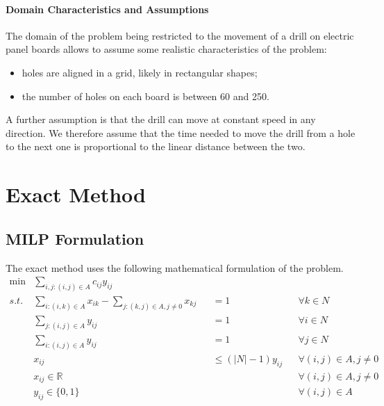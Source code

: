 \documentclass{article}
\begin{document}
\paragraph{Domain Characteristics and Assumptions}
The domain of the problem being restricted to the movement of a drill on electric panel boards allows to assume some realistic characteristics of the problem:
\begin{itemize}
    \item holes are aligned in a grid, likely in rectangular shapes;
    \item the number of holes on each board is between 60 and 250.
\end{itemize}
A further assumption is that the drill can move at constant speed in any direction.
We therefore assume that the time needed to move the drill from a hole to the next one is proportional to the linear distance between the two.

\section{Exact Method}
\label{sec:exact}

\subsection{MILP Formulation}
The exact method uses the following mathematical formulation of the problem.
\begin{align}
    \min & \sum_{i,j : (i,j) \in A} c_{i j} y_{i j}                                                                                                 \\
    \label{MILP:consume}
    s.t. & \sum_{i : (i,k) \in A} x_{i k} - \sum_{j : (k,j) \in A, j \neq 0} x_{k j} &  & = 1                    &  & \forall k \in N               \\
    \label{MILP:output}
         & \sum_{j : (i,j) \in A} y_{i j}                                            &  & = 1                    &  & \forall i \in N               \\
    \label{MILP:input}
         & \sum_{i : (i,j) \in A} y_{i j}                                            &  & = 1                    &  & \forall j \in N               \\
    \label{MILP:activation}
         & x_{i j}                                                                   &  & \leq (|N| - 1) y_{i j} &  & \forall (i,j) \in A, j \neq 0 \\
         & x_{i j} \in \mathbb{R}                                                    &  &                        &  & \forall (i,j) \in A, j \neq 0 \\
         & y_{i j} \in \{0, 1\}                                                      &  &                        &  & \forall (i,j) \in A
\end{align}
\end{document}
